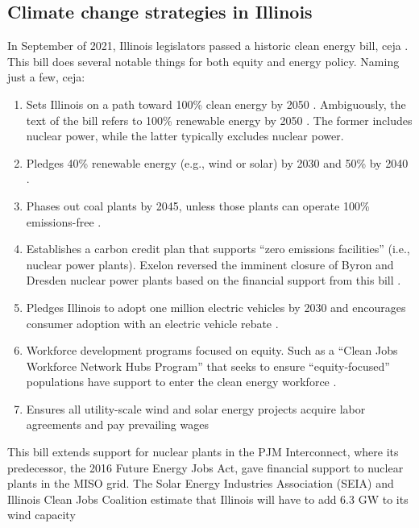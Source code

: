 \subsection{Climate change strategies in Illinois}
\label{section:ceja}
In September of 2021, Illinois legislators passed a historic clean energy bill,
\gls{ceja} \cite{harmon_climate_2021}. This bill does several notable things for
both equity and energy policy. Naming just a few, \gls{ceja}:
\begin{enumerate}
  \item Sets Illinois on a path toward 100\% clean energy by 2050
  \cite{office_of_governor_jb_pritzker_gov_2021}. Ambiguously,
  the text of the bill refers to 100\% renewable energy by 2050 \cite{harmon_climate_2021}.
  The former includes nuclear power, while the latter typically excludes nuclear power.
  \item Pledges 40\% renewable energy (e.g., wind or solar) by 2030 and 50\% by 2040
  \cite{office_of_governor_jb_pritzker_gov_2021}.
  \item Phases out coal plants by 2045, unless those plants can operate 100\% emissions-free
  \cite{office_of_governor_jb_pritzker_gov_2021}.
  \item Establishes a carbon credit plan that supports “zero emissions facilities”
  (i.e., nuclear power plants). Exelon reversed the imminent closure of Byron and
  Dresden nuclear power plants based on the financial support from this bill \cite{brown_two_2021}.
  \item Pledges Illinois to adopt one million electric vehicles by 2030 and
  encourages consumer adoption with an electric vehicle rebate
  \cite{office_of_governor_jb_pritzker_gov_2021}.
  \item Workforce development programs focused on equity. Such as a
  “Clean Jobs Workforce Network Hubs Program” that seeks to ensure “equity-focused”
  populations have support to enter the clean energy workforce \cite{office_of_governor_jb_pritzker_gov_2021}.
  \item Ensures all utility-scale wind and solar energy projects acquire labor
  agreements and pay prevailing wages \cite{office_of_governor_jb_pritzker_gov_2021}
\end{enumerate}
This bill extends support for nuclear plants in the PJM Interconnect, where its
predecessor, the 2016 Future Energy Jobs Act, gave financial support to nuclear
plants in the MISO grid. The Solar Energy Industries Association (SEIA) and Illinois
Clean Jobs Coalition estimate that Illinois will have to add 6.3 GW to its wind capacity
